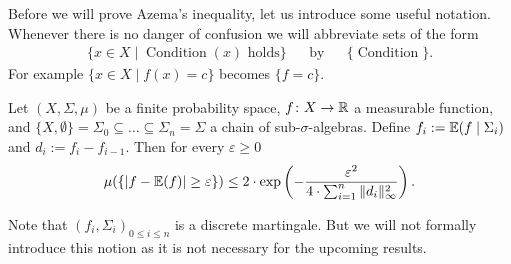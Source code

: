 Before we will prove Azema's inequality, let us introduce some useful notation. Whenever there is no danger of confusion we will abbreviate sets of the form
\begin{align*}
	\{x\in X\mid \operatorname{Condition}(x)\text{ holds}\} &   & \text{by} &   & \{\operatorname{Condition}\}. 
\end{align*}
For example $\{x\in X\mid f(x)= c\}$ becomes $\{f= c\}$.
		
		
\begin{lemma}\label{lem:azema}
	Let $(X,\Sigma,\mu)$ be a finite probability space, $f\colon X\to\mathbb{R}$ a measurable function, and $\{X,\emptyset\}=\Sigma_0\subseteq\dots\subseteq\Sigma_n=\Sigma$ a chain of sub-$\sigma$-algebras. Define $f_i:=\mathbb{E}(f\mid\Sigma_i)$ and $d_i:=f_i-f_{i-1}$. Then for every $\varepsilon\geq0$
	\[\mu(\{|f-\mathbb{E}(f)|\geq \varepsilon\})\leq 2\cdot\exp\left(-\frac{\varepsilon^2}{4\cdot\sum_{i=1}^{n}\|d_i\|^2_\infty}\right).\]
\end{lemma}
Note that $(f_i,\Sigma_i)_{0\leq i\leq n}$ is a discrete martingale. But we will not formally introduce this notion as it is not necessary for the upcoming results.
		
